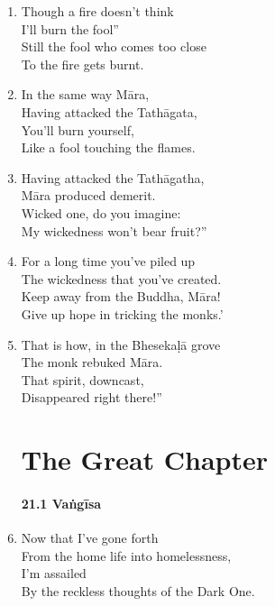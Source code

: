 \documentclass[10pt, openany]{book}
\newcommand*{\vleftofline}[1]{\leavevmode\llap{#1}}
\begin{document}
\begin{enumerate}
\item \vleftofline{‘}Though a fire doesn’t think\\
\vleftofline{“}I’ll burn the fool”\\
Still the fool who comes too close\\
To the fire gets burnt.

\item \vleftofline{‘}In the same way Māra,\\
Having attacked the Tathāgata,\\
You’ll burn yourself,\\
Like a fool touching the flames.

\item \vleftofline{‘}Having attacked the Tathāgatha,\\
Māra produced demerit.\\
Wicked one, do you imagine:\\
\vleftofline{“}My wickedness won’t bear fruit?”

\item \vleftofline{‘}For a long time you’ve piled up\\
The wickedness that you’ve created.\\
Keep away from the Buddha, Māra!\\
Give up hope in tricking the monks.’

\item That is how, in the Bhesekaḷā grove\\
The monk rebuked Māra.\\
That spirit, downcast,\\
Disappeared right there!”

\chapter*{The Great Chapter}


\subsubsection*{21.1 Vaṅgīsa}

\item \vleftofline{“}Now that I’ve gone forth\\
From the home life into homelessness,\\
I’m assailed\\
By the reckless thoughts of the Dark One.


\end{enumerate}
\end{document}
